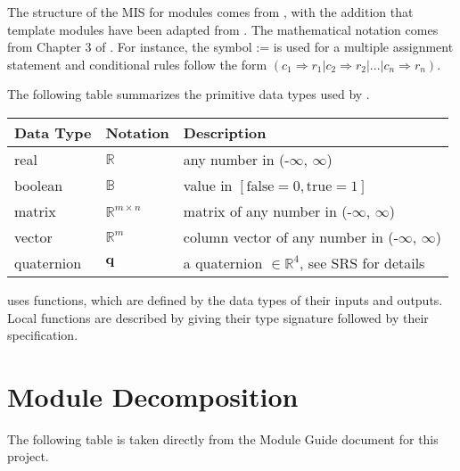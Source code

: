 \documentclass[12pt, titlepage]{article}
\begin{document}

The structure of the MIS for modules comes from \citet{HoffmanAndStrooper1995}, with the addition
that template modules have been adapted from \cite{GhezziEtAl2003}.  The mathematical notation comes
from Chapter 3 of \citet{HoffmanAndStrooper1995}.  For instance, the symbol := is used for a
multiple assignment statement and conditional rules follow the form $(c_1 \Rightarrow r_1 | c_2
\Rightarrow r_2 | ... | c_n \Rightarrow r_n )$.

The following table summarizes the primitive data types used by \progname.

\begin{center}
\renewcommand{\arraystretch}{1.2}
\noindent
\begin{tabular}{l l p{7.5cm}}
\toprule
\textbf{Data Type} & \textbf{Notation} & \textbf{Description}\\
\midrule
real & $\mathbb{R}$ & any number in (-$\infty$, $\infty$)\\
boolean & $\mathbb{B}$ & value in $[\text{false}=0, \text{true}=1]$\\
matrix & $\mathbb{R}^{m \times n}$ & matrix of any number in (-$\infty$, $\infty$)\\
vector & $\mathbb{R}^{m}$ & column vector of any number in (-$\infty$, $\infty$)\\
quaternion & $\mathbf{q}$ & a quaternion $\in \mathbb{R}^4$, see SRS for details\\
\bottomrule
\end{tabular}
\end{center}

\noindent
\progname{} uses functions, which are defined by the data types of their inputs and outputs. Local
functions are described by giving their type signature followed by their specification.

\section{Module Decomposition}

The following table is taken directly from the Module Guide document for this project.
\end{document}
